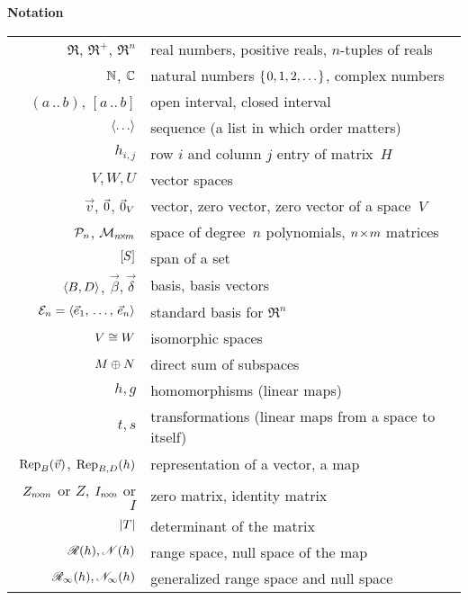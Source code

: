 \thispagestyle{empty}
\begin{center}
  \textbf{Notation}  \\[2ex]
  \begin{tabular}{r|l}
    \( \Re \), \( \Re^+ \), \( \Re^n \) &real numbers, positive reals, $n$-tuples of reals \\
    \( \N              \),
    \( \C              \)  &natural numbers \( \set{0,1,2,\ldots} \), complex numbers                           \\
    \( (a\,..\,b) \), \( [a\,..\,b] \) &open interval, closed interval   \\
    \( \sequence{\ldots} \)&sequence (a list in which order matters)    \\
    \( h_{i,j} \)          &row \( i \) and column \( j \) entry of matrix~$H$ \\
    \( V,W,U \)            &vector spaces               \\
    \( \vec{v} \),
    $\zero$, $\zero_V$     &vector, zero vector, zero vector of a space~$V$   \\
    \( \polyspace_n \), \( \matspace_{\nbym{n}{m}} \)  
                          &space of degree~\( n \) polynomials, \( \nbym{n}{m} \) matrices      \\
    \( \spanof{S} \)       &span of a set                   \\
    \( \sequence{B,D} \), \( \vec{\beta},\vec{\delta} \)         
                          &basis, basis vectors  \\
    \( \stdbasis_n=\sequence{\vec{e}_1,\,\ldots,\,\vec{e}_n} \)         
                          &standard basis for $\Re^n$  \\
    \( V\isomorphicto W \) &isomorphic spaces                         \\
    \( M\directsum N \)    &direct sum of subspaces                   \\
    \( h,g \)              &homomorphisms (linear maps)                \\
    \( t,s \)              &transformations (linear maps from a space to itself) \\
    \( \rep{\vec{v}}{B} \), \( \rep{h}{B,D} \)     
                          &representation of a vector, a map    \\
    \( Z_{\nbym{n}{m}} \) or \( Z \), \(I_{\nbyn{n}}\) or \( I \)  &zero matrix, identity matrix    \\
    \( \deter{T} \)        &determinant of the matrix       \\
    \( \rangespace{h},\nullspace{h} \)
                           &range space,  null space of the map  \\
    \( \genrangespace{h},\gennullspace{h} \)
                           &generalized range space and null space
  \end{tabular}
\end{center}
